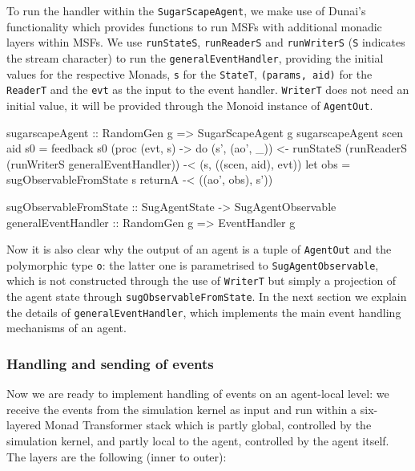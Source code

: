 To run the handler within the \texttt{SugarScapeAgent}, we make use of Dunai's functionality which provides functions to run MSFs with additional monadic layers within MSFs. We use \texttt{runStateS}, \texttt{runReaderS} and \texttt{runWriterS} (\texttt{S} indicates the stream character) to run the \texttt{generalEventHandler}, providing the initial values for the respective Monads, \texttt{s} for the \texttt{StateT}, \texttt{(params, aid)} for the \texttt{ReaderT} and the \texttt{evt} as the input to the event handler. \texttt{WriterT} does not need an initial value, it will be provided through the Monoid instance of \texttt{AgentOut}.

\begin{HaskellCode}
sugarscapeAgent :: RandomGen g => SugarScapeAgent g
sugarscapeAgent scen aid s0 = feedback s0 (proc (evt, s) -> do
  (s', (ao', _)) <- runStateS 
                      (runReaderS 
                        (runWriterS generalEventHandler)) -< (s, ((scen, aid), evt))
  let obs = sugObservableFromState s
  returnA -< ((ao', obs), s'))

sugObservableFromState :: SugAgentState -> SugAgentObservable
generalEventHandler :: RandomGen g => EventHandler g
\end{HaskellCode}

Now it is also clear why the output of an agent is a tuple of \texttt{AgentOut} and the polymorphic type \texttt{o}: the latter one is parametrised to \texttt{SugAgentObservable}, which is not constructed through the use of \texttt{WriterT} but simply a projection of the agent state through \texttt{sugObservableFromState}. In the next section we explain the details of \texttt{generalEventHandler}, which implements the main event handling mechanisms of an agent.

\subsubsection{Handling and sending of events}
Now we are ready to implement handling of events on an agent-local level: we receive the events from the simulation kernel as input and run within a six-layered Monad Transformer stack which is partly global, controlled by the simulation kernel, and partly local to the agent, controlled by the agent itself. The layers are the following (inner to outer):

